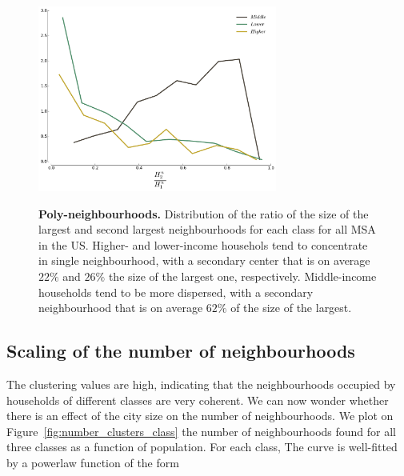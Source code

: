 \begin{figure} 
    \includegraphics[width=0.7\textwidth]{gfx/chapter-segregation/neighbourhoods_polycentrism.pdf}\\
    \caption{{\bf Poly-neighbourhoods. } Distribution of the ratio of the size of the
        largest and second largest neighbourhoods for each class for all MSA in
        the US. Higher- and lower-income househols tend to concentrate in single
        neighbourhood, with a secondary center that is on average $22\%$ and
        $26\%$ the size of the largest one, respectively. Middle-income
        households tend to be more dispersed, with a secondary neighbourhood that is on
        average $62\%$ of the size of the largest.} 
        \label{fig:polycentrism} 
\end{figure}

 \subsection{Scaling of the number of neighbourhoods}
       \label{ssub:dependence_on_city_size}
       
The clustering values are high, indicating that the neighbourhoods occupied by
households of different classes are very coherent. We can now wonder whether
there is an effect of the city size on the number of neighbourhoods. We plot on
Figure~\ref{fig:number_clusters_class} the number of neighbourhoods found for all
three classes as a function of population. For each class, The curve is
well-fitted by a powerlaw function of the form

